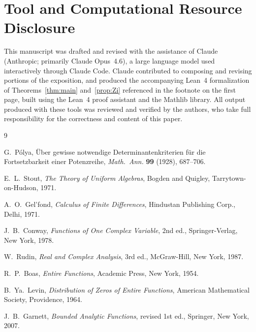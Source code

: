 \documentclass{amsart}
\theoremstyle{definition}
\begin{document}
\section*{Tool and Computational Resource Disclosure}

This manuscript was drafted and revised with the assistance of
Claude (Anthropic; primarily Claude Opus~4.6), a large language model used
interactively through Claude Code.  Claude contributed to composing
and revising portions of the exposition, and produced the
accompanying Lean~4 formalization of Theorems~\ref{thm:main}
and~\ref{prop:Zi} referenced in the footnote on the first page, built
using the Lean~4 proof assistant and the Mathlib library.  All output
produced with these tools was reviewed and verified by the authors,
who take full responsibility for the correctness and content of this
paper.

\begin{thebibliography}{9}

G.~P\'olya,
\"Uber gewisse notwendige Determinantenkriterien f\"ur die Fortsetzbarkeit
einer Potenzreihe,
\textit{Math.\ Ann.} \textbf{99} (1928), 687--706.

E.~L.~Stout,
\textit{The Theory of Uniform Algebras},
Bogden and Quigley, Tarrytown-on-Hudson, 1971.

A.~O.~Gel'fond,
\textit{Calculus of Finite Differences},
Hindustan Publishing Corp., Delhi, 1971.

J.~B.~Conway,
\textit{Functions of One Complex Variable}, 2nd ed.,
Springer-Verlag, New York, 1978.

W.~Rudin,
\textit{Real and Complex Analysis}, 3rd ed.,
McGraw-Hill, New York, 1987.

R.~P.~Boas,
\textit{Entire Functions},
Academic Press, New York, 1954.

B.~Ya.~Levin,
\textit{Distribution of Zeros of Entire Functions},
American Mathematical Society, Providence, 1964.

J.~B.~Garnett,
\textit{Bounded Analytic Functions}, revised 1st ed.,
Springer, New York, 2007.

\end{thebibliography}
\end{document}
